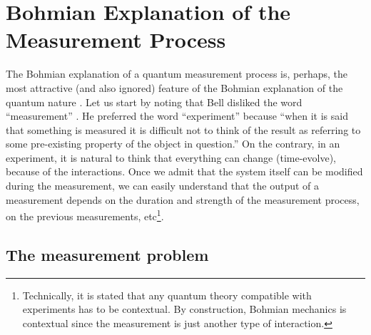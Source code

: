 \documentclass[nofootinbib, secnumarabic, amsmath, nobibnotes,10pt,aps,pra]{revtex4-1}
\begin{document}
\section{Bohmian Explanation of the Measurement Process}\label{om.sec_measurement}

The Bohmian explanation of a quantum measurement process is, perhaps, the most attractive (and also ignored) feature of the Bohmian explanation of the quantum nature \cite{om.bell1990,om.Durrllibre,om.Goldsteinobserver,om.Bell1966,om.bomhhiley1993,om.reviewabc,om.llibreph}. Let us start by noting that Bell disliked the word ``measurement'' \cite{om.bell1990}. He preferred the word ``experiment'' because ``when it is said that something is measured it is difficult not to think of the result as referring to some pre-existing property of the object in question.'' On the contrary, in an experiment, it is natural to think that everything can change (time-evolve), because of the interactions. Once we admit that the system itself can be modified during the measurement, we can easily understand that the output of a measurement depends on the duration and strength of the measurement process, on the previous measurements, etc\footnote{Technically,  it is stated that any quantum theory compatible with experiments has to be contextual. By construction, Bohmian mechanics is contextual since the measurement is just another type of interaction.}.

\subsection{The measurement problem}\label{measpro}
\end{document}

